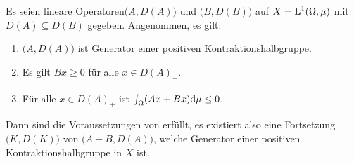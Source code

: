 \begin{folg}\label{Störungstheorem nach Kato Spezialfall}
Es seien lineare Operatoren\newline $\big(A, D(A)\big)$ und $\big(B, D(B)\big)$ auf $X=\textnormal{L}^1(\Omega,\mu)$  mit $D(A)\subseteq D(B)$ gegeben. Angenommen, es gilt:
\begin{enumerate}
\item $\big(A, D(A)\big)$ ist Generator einer positiven Kontraktionshalbgruppe. %
\item Es gilt $Bx\geq0$ für alle $x\in D(A)_+$.
\item Für alle $x\in D(A)_+$ ist $\int_\Omega (Ax+Bx)\textnormal d\mu\leq 0$.
\end{enumerate}
Dann sind die Voraussetzungen von  erfüllt, es existiert also eine Fortsetzung $\big(K, D(K)\big)$ von $\big(A+B, D(A)\big)$, welche Generator einer positiven Kontraktionshalbgruppe in $X$ ist.
\end{folg}
\newpage
